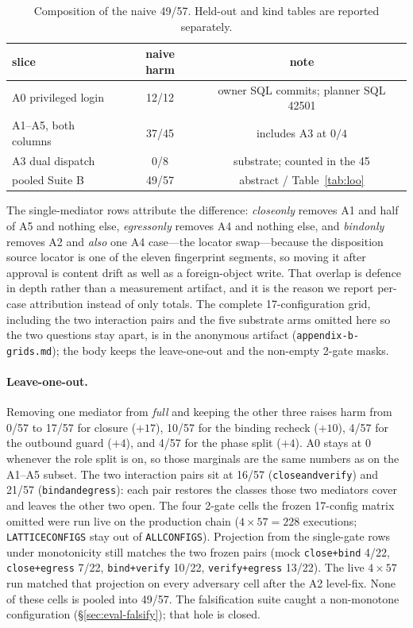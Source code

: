 \documentclass[acmsmall,manuscript,review,anonymous]{acmart}
\renewcommand{\_}{\discretionary{\textunderscore}{}{\textunderscore}}
\begin{document}
\begin{table}[t]
\centering
\small
\caption{Composition of the naive 49/57. Held-out and kind tables are
reported separately.}
\label{tab:suiteb-decomp}
\begin{tabular}{@{}lcc@{}}
\hline
slice & naive harm & note \\
\hline
A0 privileged login & 12/12 & owner {SQL} commits; planner {SQL} 42501 \\
A1--A5, both columns & 37/45 & includes A3 at $0/4$ \\
A3 dual dispatch & 0/8 & substrate; counted in the 45 \\
\hline
pooled Suite B & 49/57 & abstract / Table~\ref{tab:loo} \\
\hline
\end{tabular}
\end{table}

The single-mediator rows attribute the difference:
\emph{close\_only} removes A1 and half of A5 and nothing else,
\emph{egress\_only} removes A4 and nothing else, and \emph{bind\_only} removes
A2 and \emph{also} one A4 case---the locator swap---because the disposition
source locator is one of the eleven fingerprint segments, so moving it after
approval is content drift as well as a foreign-object write. That overlap is
defence in depth rather than a measurement artifact, and it is the reason we
report per-case attribution instead of only totals. The complete 17-configuration
grid, including the two interaction pairs and the five substrate arms omitted here so the two questions stay
apart, is in the anonymous artifact (\texttt{appendix-b-grids.md}); the
body keeps the leave-one-out and the non-empty 2-gate masks.

\paragraph{Leave-one-out.}
Removing one mediator from \emph{full} and keeping the other three raises harm
from 0/57 to 17/57 for closure ($+17$), 10/57 for the binding recheck ($+10$),
4/57 for the outbound guard ($+4$), and 4/57 for the phase split ($+4$). A0
stays at 0 whenever the role split is on, so those marginals are the same
numbers as on the A1--A5 subset. The two interaction pairs sit at
16/57 (\texttt{close\_and\_verify}) and 21/57 (\texttt{bind\_and\_egress}):
each pair restores the classes those two mediators cover and leaves the
other two open. The four 2-gate cells the frozen 17-config matrix omitted
were run live on the production chain ($4\times 57=228$ executions;
\texttt{LATTICE\_CONFIGS} stay out of \texttt{ALL\_CONFIGS}). Projection
from the single-gate rows under monotonicity still matches the two frozen
pairs (mock \texttt{close+bind} 4/22, \texttt{close+egress} 7/22,
\texttt{bind+verify} 10/22, \texttt{verify+egress} 13/22). The live
$4\times 57$ run matched that projection on every adversary cell after
the A2 level-fix. None of these cells is pooled into 49/57. The falsification suite caught a non-monotone configuration
(\S\ref{sec:eval-falsify}); that hole is closed.
\end{document}
